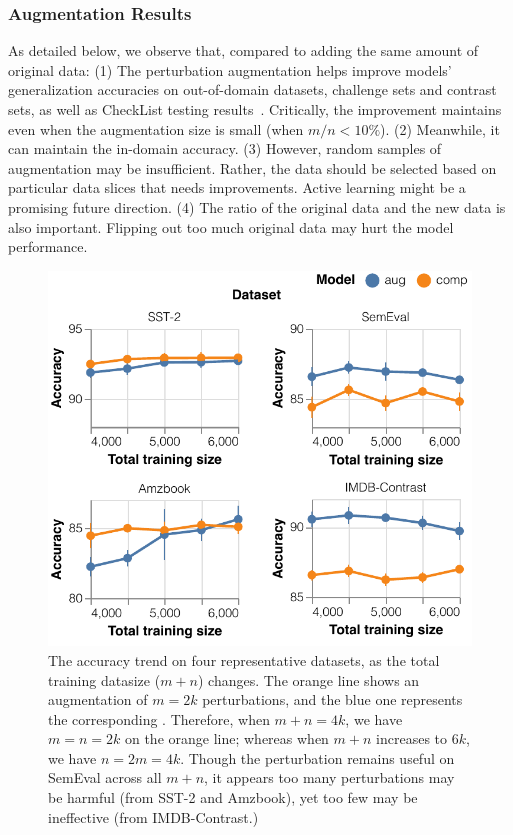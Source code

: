 \subsubsection{Augmentation Results}
As detailed below, we observe that, compared to adding the same amount of original data: 
(1) The perturbation augmentation helps improve models' generalization accuracies on out-of-domain datasets, challenge sets and contrast sets, as well as CheckList testing results~\cite{checklist:acl20}.
Critically, the improvement maintains even when the augmentation size is small (\eg when $m/n<10\%$).
(2) Meanwhile, it can maintain the in-domain accuracy.
(3) However, random samples of augmentation may be insufficient. Rather, the data should be selected based on particular data slices that needs improvements. 
Active learning might be a promising future direction.
(4) The ratio of the original data and the new data is also important. Flipping out too much original data may hurt the model performance.




\begin{figure}[t]
\centering
\includegraphics[width=1\columnwidth]{figures/sst_trend}
\vspace{-15pt}
\caption{The accuracy trend on four representative datasets, as the total training datasize ($m+n$) changes. The orange line shows an augmentation of $m=2k$ perturbations, and the blue one represents the corresponding \mcomp.
Therefore, when $m+n=4k$, we have $m=n=2k$ on the orange line; whereas when $m+n$ increases to $6k$, we have $n=2m=4k$.
Though the perturbation remains useful on SemEval across all $m+n$, it appears too many perturbations may be harmful (from SST-2 and Amzbook), yet too few may be ineffective (from IMDB-Contrast.)
}
\vspace{-10pt}
\label{fig:sst_trend}
\end{figure}

